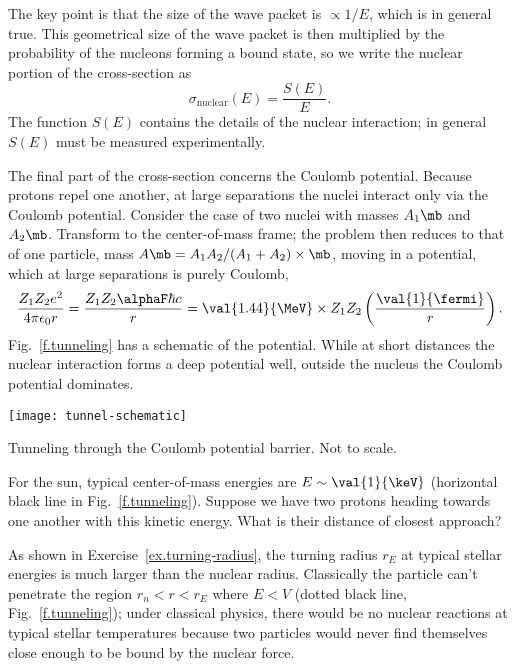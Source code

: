 The key point is that the size of the wave packet is $\propto 1/E$, which is in general true. This geometrical size of the wave packet is then multiplied by the probability of the nucleons forming a bound state, so we write the nuclear portion of the cross-section as
\[
	\sigma_{\mathrm{nuclear}}(E) = \frac{S(E)}{E}.
\]
The function $S(E)$ contains the details of the nuclear interaction; in general $S(E)$ must be measured experimentally.

The final part of the cross-section concerns the Coulomb potential.
Because protons repel one another, at large separations the nuclei interact only via the Coulomb potential. Consider the case of two nuclei with masses $A_{1}\mb$ and $A_{2}\mb$. Transform to the center-of-mass frame; the problem then reduces to that of one particle, mass $A\mb = A_{1}A_{2}/(A_{1}+A_{2})\times\mb$, moving in a potential, which at large separations is purely Coulomb,
\[ \frac{Z_{1}Z_{2}e^{2}}{4\pi\epsilon_{0}r} = \frac{Z_{1}Z_{2}\alphaF\hbar c}{r} = \val{1.44}{\MeV}\times Z_{1}Z_{2}\left(\frac{\val{1}{\fermi}}{r}\right). \]
Fig.~\ref{f.tunneling} has a schematic of the potential. While at short distances the nuclear interaction forms a deep potential well, outside the nucleus the Coulomb potential dominates.
\begin{marginfigure}
\texttt{[image: tunnel-schematic]}
\caption[Tunneling through the Coulomb potential barrier]{Tunneling through the Coulomb potential barrier. Not to scale.}
\label{f.tunneling}
\end{marginfigure}

\begin{exercisebox}
\label{ex.turning-radius}
For the sun, typical center-of-mass energies are $E \sim \val{1}{\keV}$ (horizontal black line in Fig.~\ref{f.tunneling}). Suppose we have two protons heading towards one another with this kinetic  energy. What is their distance of closest approach?
\end{exercisebox}

As shown in Exercise~\ref{ex.turning-radius}, the turning radius $r_{E}$ at typical stellar energies is much larger than the nuclear radius.  Classically the particle can't penetrate the region $r_{n} < r < r_{E}$ where $E < V$ (dotted black line, Fig.~\ref{f.tunneling}); under classical physics, there would be no nuclear reactions at typical stellar temperatures because two particles would never find themselves close enough to be bound by the nuclear force.

